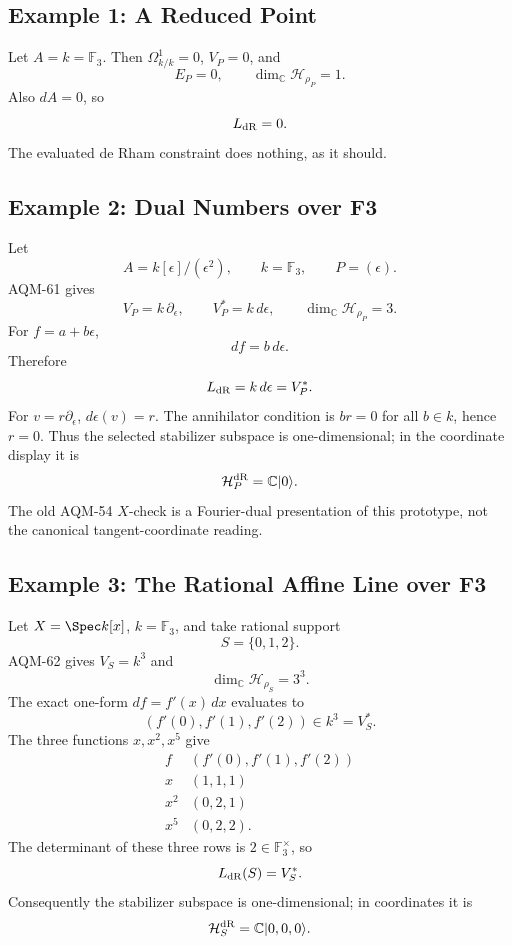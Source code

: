 \subsection{Example 1: A Reduced Point}

Let \(A=k=\mathbb F_3\).  Then \(\Omega^1_{k/k}=0\), \(V_P=0\), and
\[
  E_P=0,\qquad \dim_{\mathbb C}\mathcal H_{\rho_P}=1.
\]
Also \(dA=0\), so
\[
  L_{\rm dR}=0.
\]
The evaluated de Rham constraint does nothing, as it should.

\subsection{Example 2: Dual Numbers over F3}

Let
\[
  A=k[\epsilon]/(\epsilon^2),\qquad k=\mathbb F_3,\qquad P=(\epsilon).
\]
AQM-61 gives
\[
  V_P=k\,\partial_\epsilon,\qquad V_P^*=k\,d\epsilon,\qquad
  \dim_{\mathbb C}\mathcal H_{\rho_P}=3.
\]
For \(f=a+b\epsilon\),
\[
  df=b\,d\epsilon.
\]
Therefore
\[
  L_{\rm dR}=k\,d\epsilon=V_P^*.
\]
For \(v=r\partial_\epsilon\), \(d\epsilon(v)=r\).  The annihilator condition is
\(br=0\) for all \(b\in k\), hence \(r=0\).  Thus the selected stabilizer
subspace is one-dimensional; in the coordinate display it is
\[
  \mathcal H_P^{\rm dR}=\mathbb C|0\rangle.
\]
The old AQM-54 \(X\)-check is a Fourier-dual presentation of this prototype,
not the canonical tangent-coordinate reading.

\subsection{Example 3: The Rational Affine Line over F3}

Let \(X=\Spec k[x]\), \(k=\mathbb F_3\), and take rational support
\[
  S=\{0,1,2\}.
\]
AQM-62 gives \(V_S=k^3\) and
\[
  \dim_{\mathbb C}\mathcal H_{\rho_S}=3^3.
\]
The exact one-form \(df=f'(x)\,dx\) evaluates to
\[
  (f'(0),f'(1),f'(2))\in k^3=V_S^*.
\]
The three functions \(x,x^2,x^5\) give
\[
\begin{array}{c|c}
f & (f'(0),f'(1),f'(2))\\ \hline
x & (1,1,1)\\
x^2 & (0,2,1)\\
x^5 & (0,2,2).
\end{array}
\]
The determinant of these three rows is \(2\in\mathbb F_3^\times\), so
\[
  L_{\rm dR}(S)=V_S^*.
\]
Consequently the stabilizer subspace is one-dimensional; in coordinates it is
\[
  \mathcal H_S^{\rm dR}=\mathbb C|0,0,0\rangle.
\]

